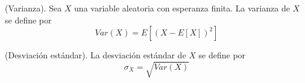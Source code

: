 \documentclass[../main.tex]{subfiles}
\begin{document}
        \begin{definition}(Varianza).
            Sea $X$ una variable aleatoria con esperanza finita. La varianza de $X$ se define por
            \begin{equation}
                 Var(X) = E[(X - E[X])^2]
            \end{equation}
        \end{definition}

        \begin{definition}(Desviación estándar).
            La desviación estándar de $X$ se define por
            \begin{equation}
                \sigma_X = \sqrt{Var(X)}
            \end{equation}
        \end{definition}
\end{document}
